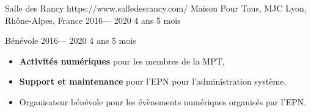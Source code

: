 \volunteerorganization%
{Salle des Rancy}%
{https://www.salledesrancy.com/}
{Maison Pour Tous, MJC}
{Lyon, Rhône-Alpes, France}%
{2016--- 2020}
{4 ans 5 mois}

\volunteerposition%
{Bénévole}%
{2016--- 2020}%
{4 ans 5 mois}%
{
	\begin{itemize}
	  \item \textbf{Activités numériques} pour les membres de la MPT,
	  \item \textbf{Support et maintenance} pour l’EPN pour l’administration système,
	  \item Organisateur bénévole pour les évènements numériques organisés par l’EPN.
	\end{itemize}
}
